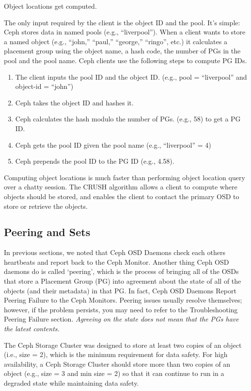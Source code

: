 \documentclass[12pt,a4paper]{report}
\begin{document}
Object locations get computed.

The only input required by the client is the object ID and the pool. It’s
simple: Ceph stores data in named pools (e.g., ``liverpool''). When a client
wants to store a named object (e.g., ``john,'' ``paul,'' ``george,'' ``ringo'', etc.)
it calculates a placement group using the object name, a hash code, the number
of PGs in the pool and the pool name. Ceph clients use the following steps to
compute PG IDs.

\begin{enumerate}
	\item The client inputs the pool ID and the object ID. (e.g., pool =
		“liverpool” and object-id = “john”)
	\item Ceph takes the object ID and hashes it.
	\item Ceph calculates the hash modulo the number of PGs. (e.g., 58) to
		get a PG ID.
	\item Ceph gets the pool ID given the pool name (e.g., “liverpool” = 4)
	\item Ceph prepends the pool ID to the PG ID (e.g., 4.58).
\end{enumerate}

Computing object locations is much faster than performing object location query
over a chatty session. The CRUSH algorithm allows a client to compute where
objects should be stored, and enables the client to contact the primary OSD to
store or retrieve the objects.

\subsection{Peering and Sets}

In previous sections, we noted that Ceph OSD Daemons check each others
heartbeats and report back to the Ceph Monitor. Another thing Ceph OSD daemons
do is called ‘peering’, which is the process of bringing all of the OSDs that
store a Placement Group (PG) into agreement about the state of all of the
objects (and their metadata) in that PG. In fact, Ceph OSD Daemons Report
Peering Failure to the Ceph Monitors. Peering issues usually resolve
themselves; however, if the problem persists, you may need to refer to the
Troubleshooting Peering Failure section. \emph{Agreeing on the state does not mean
that the PGs have the latest contents.}

The Ceph Storage Cluster was designed to store at least two copies of an object
(i.e., size = 2), which is the minimum requirement for data safety. For high
availability, a Ceph Storage Cluster should store more than two copies of an
object (e.g., size = 3 and min size = 2) so that it can continue to run in a
degraded state while maintaining data safety.
\end{document}
